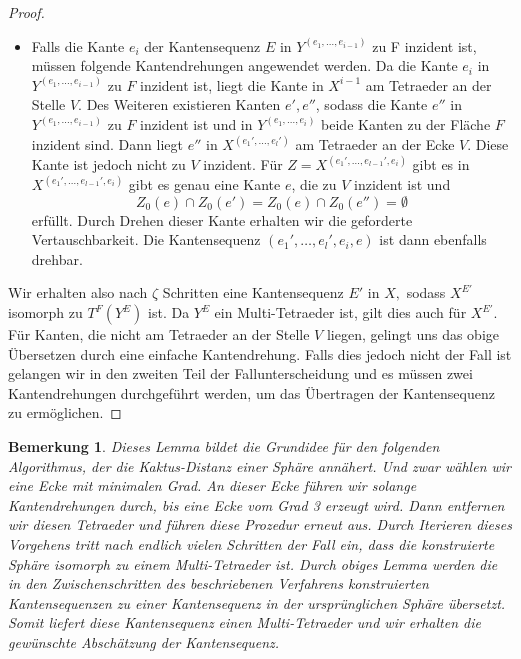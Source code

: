 \documentclass[12pt,titlepage,twoside,cleardoublepage]{article}
\theoremstyle{nummermitklammern}
\newtheorem{bemerkung}[temp]{Bemerkung}
\newtheorem{bemerkung}[zahl]{Bemerkung}
\numberwithin{equation}{section}
\begin{document}
\begin{proof}
\begin{itemize}
\item Falls die Kante $e_i$ der Kantensequenz $E$ in $Y^{(e_1,\ldots,e_{i-1})}$ zu F inzident ist, müssen folgende Kantendrehungen angewendet werden. Da die Kante $e_i$ in $Y^{(e_1,\ldots,e_{i-1})}$ zu $F$ inzident ist, liegt die Kante in $X^{i-1}$ am Tetraeder an der Stelle $V.$
Des Weiteren existieren Kanten $e',e''$, sodass die Kante $e''$ in $Y^{(e_1,\ldots,e_{i-1})}$ zu $F$ inzident ist und in $Y^{(e_1,\ldots,e_{i})}$ beide Kanten zu der Fläche $F$ inzident sind.
Dann liegt $e''$ in $X^{(e_1',\ldots,e_l')}$ am Tetraeder an der Ecke $V.$ Diese Kante ist jedoch nicht zu $V$ inzident.  
Für $Z=X^{(e_1',\ldots,e_{l-1}',e_i)}$ gibt es in $X^{(e_1',\ldots,e_{l-1}',e_i)}$ gibt es genau eine Kante $e$, die zu $V$ inzident ist und 
 \[
Z_0(e)\cap Z_0(e')=Z_0(e)\cap Z_0(e'')=\emptyset
\]
erfüllt. Durch Drehen dieser Kante erhalten wir die geforderte Vertauschbarkeit. Die Kantensequenz $(e_1',\ldots,e_l',e_i,e)$ ist dann ebenfalls drehbar.
\end{itemize}
Wir erhalten also nach $\zeta$ Schritten eine Kantensequenz $E'$ in $X,$ sodass $X^{E'}$ isomorph zu $T^F(Y^{E})$ ist. Da $Y^{E}$ ein Multi-Tetraeder ist, gilt dies auch für $X^{E'}.$ Für Kanten, die nicht am Tetraeder an der Stelle $V$ liegen, gelingt uns das obige Übersetzen durch eine einfache Kantendrehung. Falls dies jedoch nicht der Fall ist gelangen wir in den zweiten Teil der Fallunterscheidung und es müssen zwei Kantendrehungen durchgeführt werden, um das Übertragen der Kantensequenz zu ermöglichen.
\end{proof}
\begin{bemerkung}\label{alg}
Dieses Lemma bildet die Grundidee für den folgenden Algorithmus, der die Kaktus-Distanz einer Sphäre annähert. Und zwar wählen wir eine Ecke mit minimalen Grad. An dieser Ecke führen wir solange Kantendrehungen durch, bis eine Ecke vom Grad 3 erzeugt wird. Dann entfernen wir diesen Tetraeder und führen diese Prozedur erneut aus. Durch Iterieren dieses Vorgehens tritt nach endlich vielen Schritten der Fall ein, dass die konstruierte Sphäre isomorph zu einem Multi-Tetraeder ist. Durch obiges Lemma werden die in den Zwischenschritten des beschriebenen Verfahrens konstruierten Kantensequenzen zu einer Kantensequenz in der ursprünglichen Sphäre übersetzt. Somit liefert diese Kantensequenz einen Multi-Tetraeder und wir erhalten die gewünschte Abschätzung der Kantensequenz.
\end{bemerkung}
\end{document}

